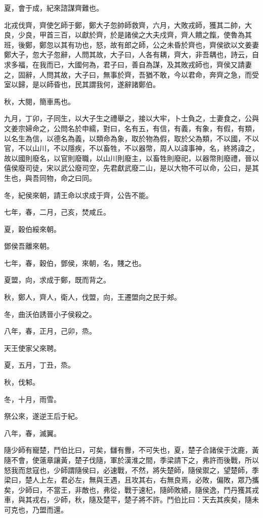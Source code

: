 \begin{pinyinscope}
夏，會于成，紀來諮謀齊難也。

北戎伐齊，齊使乞師于鄭，鄭大子忽帥師救齊，六月，大敗戎師，獲其二帥，大良，少良，甲首三百，以獻於齊，於是諸侯之大夫戍齊，齊人饋之餼，使魯為其班，後鄭，鄭忽以其有功也，怒，故有郎之師，公之未昏於齊也，齊侯欲以文姜妻鄭大子，忽大子忽辭，人問其故，大子曰，人各有耦，齊大，非吾耦也，詩云，自求多福，在我而已，大國何為，君子曰，善自為謀，及其敗戎師也，齊侯又請妻之，固辭，人問其故，大子曰，無事於齊，吾猶不敢，今以君命，奔齊之急，而受室以歸，是以師昏也，民其謂我何，遂辭諸鄭伯。

秋，大閱，簡車馬也。

九月，丁卯，子同生，以大子生之禮舉之，接以大牢，卜士負之，士妻食之，公與文姜宗婦命之，公問名於申繻，對曰，名有五，有信，有義，有象，有假，有類，以名生為信，以德名為義，以類命為象，取於物為假，取於父為類，不以國，不以官，不以山川，不以隱疾，不以畜牲，不以器幣，周人以諱事神，名，終將諱之，故以國則廢名，以官則廢職，以山川則廢主，以畜牲則廢祀，以器幣則廢禮，晉以僖侯廢司徒，宋以武公廢司空，先君獻武廢二山，是以大物不可以命，公曰，是其生也，與吾同物，命之曰同。

冬，紀侯來朝，請王命以求成于齊，公告不能。

七年，春，二月，己亥，焚咸丘。

夏，穀伯綏來朝。

鄧侯吾離來朝。

七年，春，穀伯，鄧侯，來朝，名，賤之也。

夏盟，向，求成于鄭，既而背之。

秋，鄭人，齊人，衛人，伐盟，向，王遷盟向之民于郟。

冬，曲沃伯誘晉小子侯殺之。

八年，春，正月，己卯，烝。

天王使家父來聘。

夏，五月，丁丑，烝。

秋，伐邾。

冬，十月，雨雪。

祭公來，遂逆王后于紀。

八年，春，滅翼。

隨少師有寵楚，鬥伯比曰，可矣，讎有釁，不可失也，夏，楚子合諸侯于沈鹿，黃隨不會，使薳章讓黃，楚子伐隨，軍於漢淮之間，季梁請下之，弗許而後戰，所以怒我而怠寇也，少師謂隨侯曰，必速戰，不然，將失楚師，隨侯禦之，望楚師，季梁曰，楚人上左，君必左，無與王遇，且攻其右，右無良焉，必敗，偏敗，眾乃攜矣，少師曰，不當王，非敵也，弗從，戰于速杞，隨師敗績，隨侯逸，鬥丹獲其戎車，與其戎右，少師，秋，隨及楚平，楚子將不許。鬥伯比曰：天去其疾矣，隨未可克也，乃盟而還。


\end{pinyinscope}
